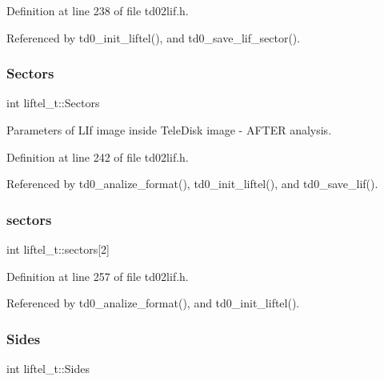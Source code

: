 Definition at line 238 of file td02lif.\+h.



Referenced by td0\+\_\+init\+\_\+liftel(), and td0\+\_\+save\+\_\+lif\+\_\+sector().

\mbox{\label{structliftel__t_aa20cc45cd196c86b7d6176914226eacf}} 
\subsubsection{\texorpdfstring{Sectors}{Sectors}}
{\footnotesize\ttfamily int liftel\+\_\+t\+::\+Sectors}



Parameters of L\+If image inside Tele\+Disk image -\/ A\+F\+T\+ER analysis. 



Definition at line 242 of file td02lif.\+h.



Referenced by td0\+\_\+analize\+\_\+format(), td0\+\_\+init\+\_\+liftel(), and td0\+\_\+save\+\_\+lif().

\mbox{\label{structliftel__t_a04c852b0fdc7a7c04d558d9a201f3f0d}} 
\subsubsection{\texorpdfstring{sectors}{sectors}}
{\footnotesize\ttfamily int liftel\+\_\+t\+::sectors\mbox{[}2\mbox{]}}



Definition at line 257 of file td02lif.\+h.



Referenced by td0\+\_\+analize\+\_\+format(), and td0\+\_\+init\+\_\+liftel().

\mbox{\label{structliftel__t_a1fafd0f113738152a2ae6251c2f528f7}} 
\subsubsection{\texorpdfstring{Sides}{Sides}}
{\footnotesize\ttfamily int liftel\+\_\+t\+::\+Sides}



